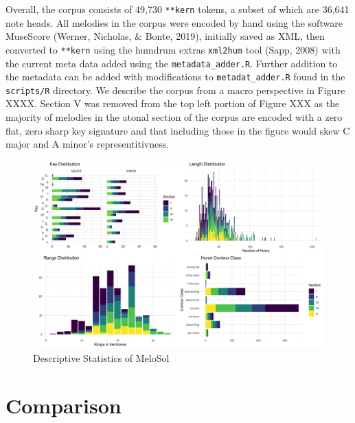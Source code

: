\documentclass[english,man,floatsintext]{apa6}
\begin{document}
Overall, the corpus consists of 49,730 \texttt{**kern} tokens, a subset of which are 36,641 note heads.
All melodies in the corpus were encoded by hand using the software MuseScore (Werner, Nicholas, \& Bonte, 2019), initially saved as XML, then converted to \texttt{**kern} using the humdrum extras \texttt{xml2hum} tool (Sapp, 2008) with the current meta data added using the \texttt{metadata\_adder.R}.
Further addition to the metadata can be added with modifications to \texttt{metadat\_adder.R} found in the \texttt{scripts/R} directory.
We describe the corpus from a macro perspective in Figure XXXX.
Section V was removed from the top left portion of Figure XXX as the majority of melodies in the atonal section of the corpus are encoded with a zero flat, zero sharp key signature and that including those in the figure would skew C major and A minor's representitivness.

\begin{figure}
\centering
\includegraphics{../img/descriptive_panel.png}
\caption{Descriptive Statistics of MeloSol}
\end{figure}

\hypertarget{comparison}{%
\section{Comparison}\label{comparison}}
\end{document}
